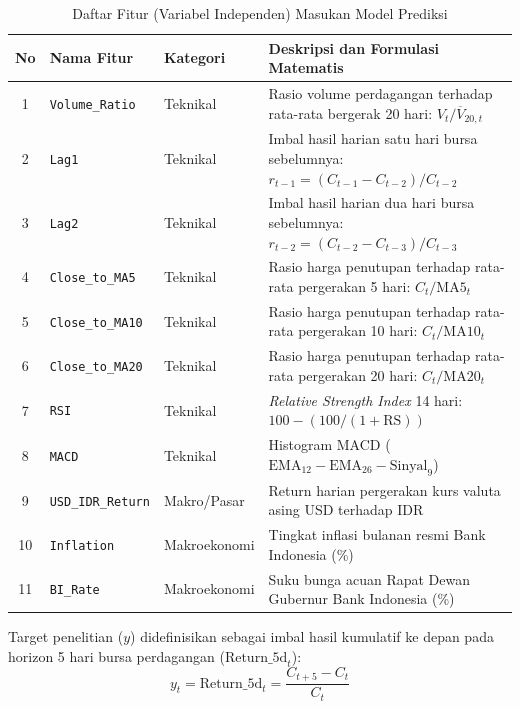 \documentclass[10pt,a4paper]{article}
\begin{document}
\begin{table}[htbp]
  \centering
  \caption{Daftar Fitur (Variabel Independen) Masukan Model Prediksi}
  \label{tab:fitur_model}
  \fontsize{8.5pt}{10.5pt}\selectfont
  \begin{tabularx}{\textwidth}{cllX}
    \toprule
    \textbf{No} & \textbf{Nama Fitur} & \textbf{Kategori} & \textbf{Deskripsi dan Formulasi Matematis} \\
    \midrule
    1 & \texttt{Volume\_Ratio} & Teknikal & Rasio volume perdagangan terhadap rata-rata bergerak 20 hari: $V_t / \overline{V}_{20,t}$ \\
    2 & \texttt{Lag1} & Teknikal & Imbal hasil harian satu hari bursa sebelumnya: $r_{t-1} = (C_{t-1}-C_{t-2})/C_{t-2}$ \\
    3 & \texttt{Lag2} & Teknikal & Imbal hasil harian dua hari bursa sebelumnya: $r_{t-2} = (C_{t-2}-C_{t-3})/C_{t-3}$ \\
    4 & \texttt{Close\_to\_MA5} & Teknikal & Rasio harga penutupan terhadap rata-rata pergerakan 5 hari: $C_t / \text{MA5}_t$ \\
    5 & \texttt{Close\_to\_MA10} & Teknikal & Rasio harga penutupan terhadap rata-rata pergerakan 10 hari: $C_t / \text{MA10}_t$ \\
    6 & \texttt{Close\_to\_MA20} & Teknikal & Rasio harga penutupan terhadap rata-rata pergerakan 20 hari: $C_t / \text{MA20}_t$ \\
    7 & \texttt{RSI} & Teknikal & \textit{Relative Strength Index} 14 hari: $100 - (100 / (1 + \text{RS}))$ \\
    8 & \texttt{MACD} & Teknikal & Histogram MACD ($\text{EMA}_{12} - \text{EMA}_{26} - \text{Sinyal}_{9}$) \\
    9 & \texttt{USD\_IDR\_Return} & Makro/Pasar & Return harian pergerakan kurs valuta asing USD terhadap IDR \\
    10 & \texttt{Inflation} & Makroekonomi & Tingkat inflasi bulanan resmi Bank Indonesia (\%) \\
    11 & \texttt{BI\_Rate} & Makroekonomi & Suku bunga acuan Rapat Dewan Gubernur Bank Indonesia (\%) \\
    \bottomrule
  \end{tabularx}
\end{table}

Target penelitian ($y$) didefinisikan sebagai imbal hasil kumulatif ke depan pada horizon 5 hari bursa perdagangan ($\text{Return\_5d}_t$):
\begin{equation}
  y_t = \text{Return\_5d}_t = \frac{C_{t+5} - C_t}{C_t}
  \label{eq:target_return}
\end{equation}
\end{document}
